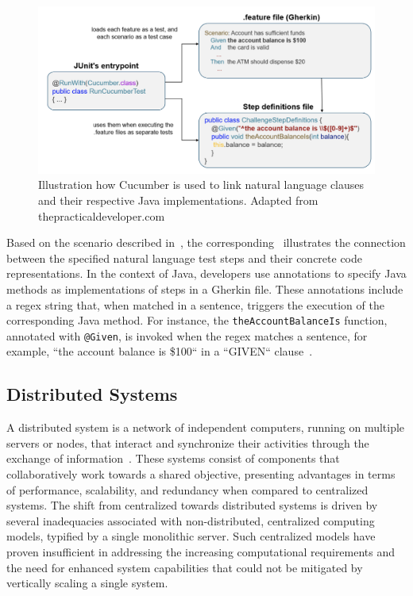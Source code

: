 \begin{figure}
    \centering
    \includegraphics[width=\linewidth]{files/figures/cucumber_test_step_mapping.png}
    \caption{Illustration how Cucumber is used to link natural language clauses and their respective Java implementations. Adapted from thepracticaldeveloper.com~\cite{thepracticaldeveloperIntroductionMicroservice}}
    \label{fig:cucumber-mapping}
\end{figure}

Based on the scenario described in~, the corresponding~ illustrates the connection between the specified natural language test steps and their concrete code representations. In the context of Java, developers use annotations to specify Java methods as implementations of steps in a Gherkin file. These annotations include a regex string that, when matched in a sentence, triggers the execution of the corresponding Java method. For instance, the \texttt{theAccountBalanceIs} function, annotated with \texttt{@Given}, is invoked when the regex matches a sentence, for example, ``the account balance is \$100`` in a ``GIVEN`` clause~\cite{noauthor_bdd_nodate}.

\subsection{Distributed Systems}
\label{subsec:dissys}
A distributed system is a network of independent computers, running on multiple servers or nodes, that interact and synchronize their activities through the exchange of information~\cite{tanenbaum2007distributed}. These systems consist of components that collaboratively work towards a shared objective, presenting advantages in terms of performance, scalability, and redundancy when compared to centralized systems. The shift from centralized towards distributed systems is driven by several inadequacies associated with non-distributed, centralized computing models, typified by a single monolithic server. Such centralized models have proven insufficient in addressing the increasing computational requirements and the need for enhanced system capabilities that could not be mitigated by vertically scaling a single system.

